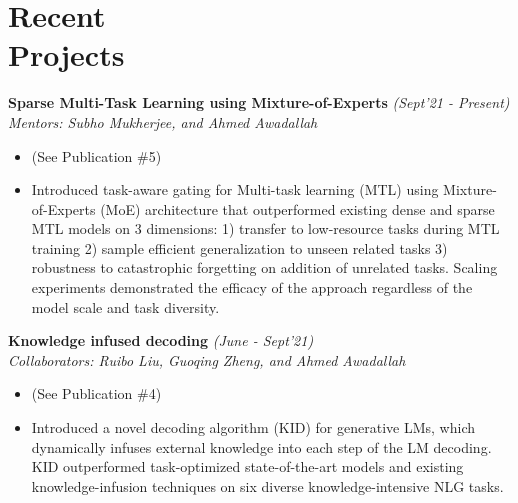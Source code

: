 \section{\mysidestyle Recent\\ Projects}
\vspace{0mm}
\textsf{\textbf{Sparse Multi-Task Learning using Mixture-of-Experts}} \hfill\textit{\small(Sept'21 - Present)}
\\ {\textit{Mentors: Subho Mukherjee, and Ahmed Awadallah}}
\normalsize
\begin{itemize}[leftmargin=*]\compresslist
    \item[] (See Publication \#5)\vspace{-1mm}
    \item[] Introduced task-aware gating for Multi-task learning (MTL) using Mixture-of-Experts (MoE) architecture that outperformed existing dense and sparse MTL models on 3 dimensions: 1) transfer to low-resource tasks during MTL training 2) sample efficient generalization to unseen related tasks 3) robustness to catastrophic forgetting on addition of unrelated tasks. Scaling experiments demonstrated the efficacy of the approach regardless of the model scale and task diversity.
\end{itemize}

\textsf{\textbf{Knowledge infused decoding}} \hfill\textit{\small(June - Sept'21)}
\\ {\textit{Collaborators: Ruibo Liu, Guoqing Zheng, and Ahmed Awadallah}}
\normalsize
\begin{itemize}[leftmargin=*]\compresslist
\item[] (See Publication \#4)\vspace{-1mm} 
\item[] Introduced a novel decoding algorithm (KID) for generative LMs, which dynamically infuses external knowledge into each step of the LM decoding. KID outperformed task-optimized state-of-the-art models and existing knowledge-infusion techniques on six diverse knowledge-intensive NLG tasks. 
\end{itemize}



